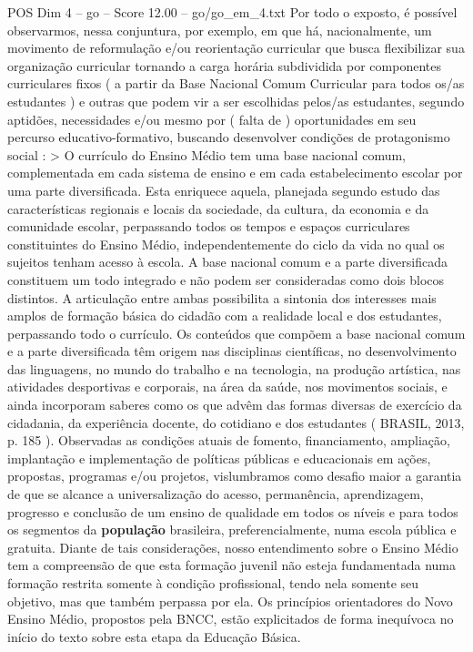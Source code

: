 \begin{textsample}{POS Dim 4 – go – Score 12.00 – go/go\_em\_4.txt}
Por todo o exposto, é possível observarmos, nessa conjuntura, por exemplo, em que há, nacionalmente, um movimento de reformulação e/ou reorientação curricular que busca flexibilizar sua organização curricular tornando a carga horária subdividida por componentes curriculares fixos ( a partir da Base Nacional Comum Curricular para todos os/as estudantes ) e outras que podem vir a ser escolhidas pelos/as estudantes, segundo aptidões, necessidades e/ou mesmo por ( falta de ) oportunidades em seu percurso educativo-formativo, buscando desenvolver condições de protagonismo social : > O currículo do Ensino Médio tem uma base nacional comum, complementada em cada sistema de ensino e em cada estabelecimento escolar por uma parte diversificada.
Esta enriquece aquela, planejada segundo estudo das características regionais e locais da sociedade, da cultura, da economia e da comunidade escolar, perpassando todos os tempos e espaços curriculares constituintes do Ensino Médio, independentemente do ciclo da vida no qual os sujeitos tenham acesso à escola.
A base nacional comum e a parte diversificada constituem um todo integrado e não podem ser consideradas como dois blocos distintos.
A articulação entre ambas possibilita a sintonia dos interesses mais amplos de formação básica do cidadão com a realidade local e dos estudantes, perpassando todo o currículo.
Os conteúdos que compõem a base nacional comum e a parte diversificada têm origem nas disciplinas científicas, no desenvolvimento das linguagens, no mundo do trabalho e na tecnologia, na produção artística, nas atividades desportivas e corporais, na área da saúde, nos movimentos sociais, e ainda incorporam saberes como os que advêm das formas diversas de exercício da cidadania, da experiência docente, do cotidiano e dos estudantes ( BRASIL, 2013, p. 185 ).
Observadas as condições atuais de fomento, financiamento, ampliação, implantação e implementação de políticas públicas e educacionais em ações, propostas, programas e/ou projetos, vislumbramos como desafio maior a garantia de que se alcance a universalização do acesso, permanência, aprendizagem, progresso e conclusão de um ensino de qualidade em todos os níveis e para todos os segmentos da \textbf{população} brasileira, preferencialmente, numa escola pública e gratuita.
Diante de tais considerações, nosso entendimento sobre o Ensino Médio tem a compreensão de que esta formação juvenil não esteja fundamentada numa formação restrita somente à condição profissional, tendo nela somente seu objetivo, mas que também perpassa por ela.
Os princípios orientadores do Novo Ensino Médio, propostos pela BNCC, estão explicitados de forma inequívoca no início do texto sobre esta etapa da Educação Básica.

\end{textsample}
